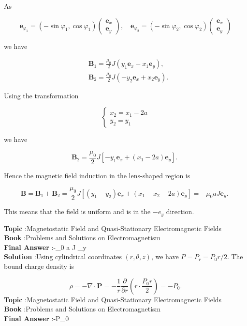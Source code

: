 \documentclass[10pt]{article}
\begin{document}
As

$$
\mathbf{e}_{\varphi_{1}}=\left(-\sin \varphi_{1}, \cos \varphi_{1}\right)\left(\begin{array}{l}
\mathbf{e}_{x} \\
\mathbf{e}_{y}
\end{array}\right), \quad \mathbf{e}_{\varphi_{2}}=\left(-\sin \varphi_{2}, \cos \varphi_{2}\right)\left(\begin{array}{l}
\mathbf{e}_{x} \\
\mathbf{e}_{y}
\end{array}\right)
$$

we have

$$
\begin{aligned}
&\mathbf{B}_{1}=\frac{\mu_{0}}{2} J\left(y_{1} \mathbf{e}_{x}-x_{1} \mathbf{e}_{y}\right), \\
&\mathbf{B}_{2}=\frac{\mu_{0}}{2} J\left(-y_{2} \mathbf{e}_{x}+x_{2} \mathbf{e}_{y}\right) .
\end{aligned}
$$

Using the transformation

$$
\left\{\begin{array}{l}
x_{2}=x_{1}-2 a \\
y_{2}=y_{1}
\end{array}\right.
$$

we have

$$
\mathbf{B}_{2}=\frac{\mu_{0}}{2} J\left[-y_{1} \mathbf{e}_{x}+\left(x_{1}-2 a\right) \mathbf{e}_{y}\right] \text {. }
$$

Hence the magnetic field induction in the lens-shaped region is

$$
\mathbf{B}=\mathbf{B}_{1}+\mathbf{B}_{2}=\frac{\mu_{0}}{2} J\left[\left(y_{1}-y_{2}\right) \mathbf{e}_{x}+\left(x_{1}-x_{2}-2 a\right) \mathbf{e}_{y}\right]=-\mu_{0} a J \mathbf{e}_{y} \text {. }
$$

This means that the field is uniform and is in the $-e_{y}$ direction.

\textbf{Topic} :Magnetostatic Field and Quasi-Stationary Electromagnetic Fields\\
\textbf{Book} :Problems and Solutions on Electromagnetism\\
\textbf{Final Answer} :-\mu_{0} a J _{y}\\


\textbf{Solution} :Using cylindrical coordinates $(r, \theta, z)$, we have $P=P_{r}=P_{0} r / 2$. The bound charge density is

$$
\rho=-\nabla \cdot \mathbf{P}=-\frac{1}{r} \frac{\partial}{\partial r}\left(r \cdot \frac{P_{0} r}{2}\right)=-P_{0} .
$$
\textbf{Topic} :Magnetostatic Field and Quasi-Stationary Electromagnetic Fields\\
\textbf{Book} :Problems and Solutions on Electromagnetism\\
\textbf{Final Answer} :-P_{0}\\
\end{document}

